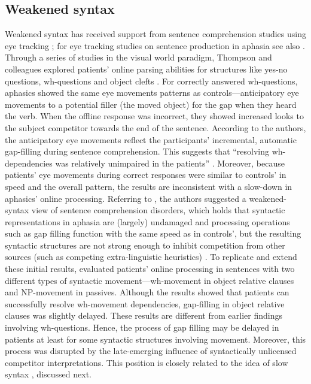 \documentclass{cambridge7A}\usepackage[]{graphicx}\usepackage[]{color}
\begin{document}
\subsection{Weakened syntax}
Weakened syntax has received support from sentence comprehension studies using eye tracking \citep[e.g.,][]{Choy:2010,Dickey2009,Dickey:2007a,hanneetal11,Meyer2012,ThompsonChoy-2009}; for eye tracking studies on sentence production in aphasia see also \cite{Cho2010,Lee2011a,Lee2011}.
Through a series of studies in the visual world paradigm, Thompson and colleagues explored patients' online parsing abilities
for structures like yes-no questions, wh-questions and object clefts \cite{Dickey:2007a,Thompson2004}.
For correctly answered wh-questions, aphasics showed the same eye movements patterns as controls---anticipatory eye movements to a potential filler (the moved object) for the gap when they heard the verb. When the offline response was incorrect, they showed increased looks to the subject competitor towards the end of the sentence.
According to the authors, the anticipatory eye movements reflect the participants' incremental, automatic gap-filling during sentence comprehension. This suggests that 
``resolving wh-dependencies was relatively unimpaired in the patients'' \citep[][p.~14]{Dickey:2007a}. Moreover, because patients' eye movements during correct responses were similar to controls' in speed and the overall pattern, the results are inconsistent with a slow-down in aphasics' online processing. 
Referring to \cite{Avrutin:2006}, the authors suggested a weakened-syntax view of sentence comprehension disorders, which holds that syntactic representations in aphasia are (largely) undamaged and processing operations such as gap filling function with the same speed as in controls', but the resulting syntactic structures are not strong enough to inhibit competition from other sources (such as competing extra-linguistic heuristics) \citep{Dickey:2007a}. 
To replicate and extend these initial results, 
\cite{Dickey2006,Dickey2009} evaluated patients' online processing in sentences with two different types of syntactic movement---wh-movement in object relative clauses and NP-movement in passives. 
Although the results showed that patients can successfully resolve wh-movement dependencies,  gap-filling in object relative clauses was slightly delayed. 
These results are different from earlier findings involving wh-questions. 
Hence, the process of gap filling may be delayed in patients at least for some syntactic structures involving movement. Moreover, this process was disrupted by the late-emerging influence of syntactically unlicensed competitor interpretations.
This position is closely related to the idea of slow syntax \citep{BurkhardtEtAl2003}, discussed next.
\end{document}
